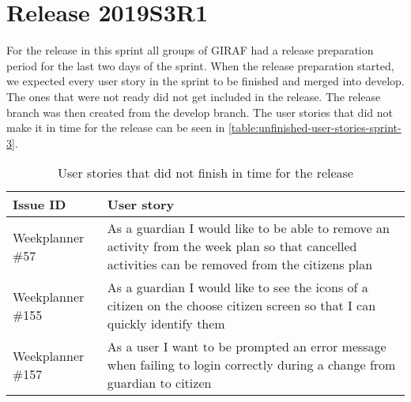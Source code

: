 \section{Release 2019S3R1}
For the release in this sprint all groups of GIRAF had a release preparation period for the last two days of the sprint. 
When the release preparation started, we expected every user story in the sprint to be finished and merged into develop. 
The ones that were not ready did not get included in the release. The release branch was then created from the develop branch.
The user stories that did not make it in time for the release can be seen in \autoref{table:unfinished-user-stories-sprint-3}.

\begin{table}[H]
    \small
    \begin{tabular}{|p{3.5cm}|p{9cm}|}
    \hline
    Issue ID        & User story   \\ \hline
    Weekplanner \#57  & As a guardian I would like to be able to remove an activity from the week plan so that cancelled activities can be removed from the citizens plan \\ \hline
    Weekplanner \#155 & As a guardian I would like to see the icons of a citizen on the choose citizen screen so that I can quickly identify them \\ \hline
    Weekplanner \#157 & As a user I want to be prompted an error message when failing to login correctly during a change from guardian to citizen \\ \hline
    \end{tabular}
    \caption{User stories that did not finish in time for the release}\label{table:unfinished-user-stories-sprint-3}
\end{table}

